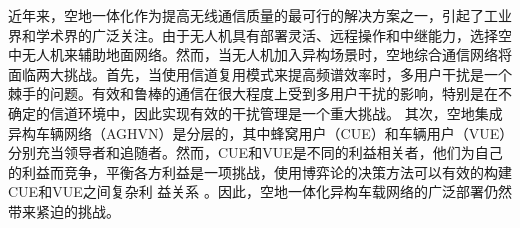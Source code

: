 近年来，空地一体化作为提高无线通信质量的最可行的解决方案之一，引起了工业界和学术界的广泛关注。由于无人机具有部署灵活、远程操作和中继能力，选择空中无人机来辅助地面网络\cite{ACO}。然而，当无人机加入异构场景时，空地综合通信网络将
面临两大挑战。首先，当使用信道复用模式来提高频谱效率时，多用户干扰是一个棘手的问题。有效和鲁棒的通信在很大程度上受到多用户干扰的影响，特别是在不确定的信道环境中，因此实现有效的干扰管理是一个重大挑战\cite{CCO}。 其次，空地集成
异构车辆网络（AGHVN）是分层的，其中蜂窝用户（CUE）和车辆用户（VUE）分别充当领导者和追随者。然而，CUE和VUE是不同的利益相关者，他们为自己的利益而竞争，平衡各方利益是一项挑战，使用博弈论的决策方法可以有效的构建CUE和VUE之间复杂利
益关系 \cite{胡益恺智能车辆决策方法研究综述}。因此，空地一体化异构车载网络的广泛部署仍然带来紧迫的挑战。

